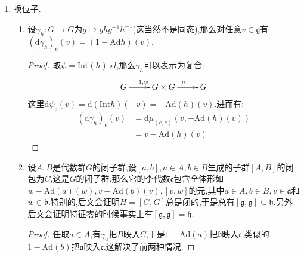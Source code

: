 \begin{enumerate}
\begin{enumerate}[(1)]
\begin{proof}
        	$H$是正规的说明$\mathrm{Int}(g),\forall g\in G$总固定$H$,进而$\mathrm{Ad}(g),\forall g\in G$总固定$\mathfrak{h}$.选取$\mathfrak{h}$的一组基,把它扩充为$\mathfrak{g}$的一组基,那么在这组基下$\mathrm{Ad}(g)$可以统一的表示为$2\times2$的分块上三角矩阵.进而它的微分$\mathrm{ad}(v)$也具有相同的矩阵形式,特别的有$[v,\mathfrak{h}]=\mathrm{ad}(g)(\mathfrak{h})\subseteq\mathfrak{h}$.
        \end{proof}
        \item 推论.设$H\le G$是闭子群,设$N=\mathrm{N}_G(H)$是正规化子.那么有$\mathfrak{n}\subseteq\mathfrak{n}_{\mathfrak{g}}(\mathfrak{h})=\{v\in\mathfrak{g}\mid[v,\mathfrak{h}]\subseteq\mathfrak{h}\}$.
        \begin{proof}
        	
        	我们解释过闭子群的正规化子$N$一定是闭子群.把上一条用在$N$的正规子群$H$上即可.
        \end{proof}
    \end{enumerate}
    \item 换位子.
    \begin{enumerate}[(1)]
    	\item 设$\gamma_h:G\to G$为$g\mapsto ghg^{-1}h^{-1}$(这当然不是同态),那么对任意$v\in\mathfrak{g}$有$(\mathrm{d}\gamma_h)_e(v)=(1-\mathrm{Ad}h)(v)$.
    	\begin{proof}
    		
    		取$\psi=\mathrm{Int}(h)\circ l$,那么$\gamma_h$可以表示为复合:
    		$$\xymatrix{G\ar[r]^{1,\psi}&G\times G\ar[r]^{\mu}&G}$$
    		这里$\mathrm{d}\psi_e(v)=\mathrm{d}(\mathrm{Int}h)(-v)=-\mathrm{Ad}(h)(v)$.进而有:
    		\begin{align*}
    			(\mathrm{d}\gamma_h)_e(v)&=\mathrm{d}\mu_{(e,e)}(v,-\mathrm{Ad}(h)(v))\\&=v-\mathrm{Ad}(h)(v)
    		\end{align*}
    	\end{proof}
        \item 设$A,B$是代数群$G$的闭子群,设$[a,b],a\in A,b\in B$生成的子群$[A,B]$的闭包为$C$,这是$G$的闭子群.那么它的李代数$\mathfrak{c}$包含全体形如$w-\mathrm{Ad}(a)(w),v-\mathrm{Ad}(b)(v),[v,w]$的元,其中$a\in A,b\in B,v\in\mathfrak{a}$和$w\in\mathfrak{b}$.特别的,后文会证明$H=[G,G]$总是闭的,于是总有$[\mathfrak{g},\mathfrak{g}]\subseteq\mathfrak{h}$.另外后文会证明特征零的时候事实上有$[\mathfrak{g},\mathfrak{g}]=\mathfrak{h}$.
        \begin{proof}
        	
        	任取$a\in A$,有$\gamma_a$把$B$映入$C$,于是$1-\mathrm{Ad}(a)$把$\mathfrak{b}$映入$\mathfrak{c}$.类似的$1-\mathrm{Ad}(b)$把$\mathfrak{a}$映入$\mathfrak{c}$.这解决了前两种情况.
        	

\end{proof}
\end{enumerate}
\end{enumerate}
